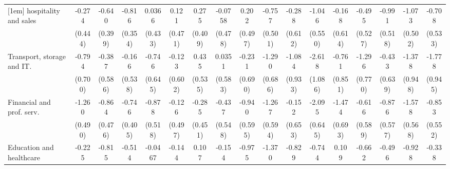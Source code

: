 {\begin{tabular}{l*{16}{c}}
[1em]
hospitality and sales&      -0.274         &      -0.640         &      -0.816\sym{*}  &      0.0366         &       0.121         &       0.275         &     -0.0758         &       0.202         &      -0.757         &      -0.288         &      -1.046         &      -0.168         &      -0.495         &      -0.991         &      -1.073\sym{*}  &      -0.708         \\
                    &     (0.444)         &     (0.399)         &     (0.354)         &     (0.433)         &     (0.471)         &     (0.409)         &     (0.478)         &     (0.497)         &     (0.501)         &     (0.612)         &     (0.550)         &     (0.614)         &     (0.527)         &     (0.518)         &     (0.502)         &     (0.533)         \\
[1em]
Transport, storage and IT.&      -0.794         &      -0.387         &      -0.166         &      -0.746         &      -0.123         &       0.435         &      0.0351         &      -0.231         &      -1.290         &      -1.084         &      -2.618\sym{*}  &      -0.761         &      -1.296         &      -0.433         &      -1.378         &      -1.778         \\
                    &     (0.700)         &     (0.586)         &     (0.538)         &     (0.645)         &     (0.602)         &     (0.535)         &     (0.583)         &     (0.690)         &     (0.686)         &     (0.933)         &     (1.086)         &     (0.851)         &     (0.770)         &     (0.639)         &     (0.948)         &     (0.945)         \\
[1em]
Financial and prof. serv.&      -1.260\sym{*}  &      -0.864         &      -0.746         &      -0.878         &      -0.126         &      -0.285         &      -0.437         &      -0.940         &      -1.267\sym{*}  &      -0.152         &      -2.095\sym{**} &      -1.474\sym{*}  &      -0.616         &      -0.876         &      -1.578\sym{**} &      -0.853         \\
                    &     (0.490)         &     (0.476)         &     (0.405)         &     (0.518)         &     (0.497)         &     (0.451)         &     (0.548)         &     (0.595)         &     (0.594)         &     (0.653)         &     (0.645)         &     (0.693)         &     (0.589)         &     (0.577)         &     (0.568)         &     (0.552)         \\
[1em]
Education and healthcare&      -0.225         &      -0.815         &      -0.514         &     -0.0467         &      -0.144         &       0.107         &      -0.154         &      -0.975         &      -1.370\sym{**} &      -0.829         &      -0.744         &       0.109         &      -0.662         &      -0.496         &      -0.928         &      -0.338         \\

\end{tabular}}
